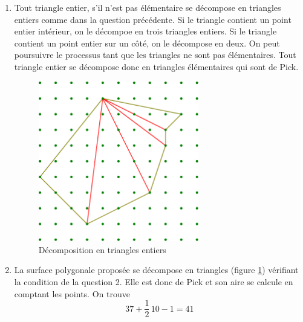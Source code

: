 \begin{enumerate}
 \item Tout triangle entier, s'il n'est pas élémentaire se décompose en triangles entiers comme dans la question précédente. 
Si le triangle contient un point entier intérieur, on le décompoe en trois triangles entiers. Si le triangle contient un point entier sur un côté, on le décompose en deux. On peut poursuivre le processus tant que les triangles ne sont pas élémentaires. Tout triangle entier se décompose donc en triangles élémentaires qui sont de Pick.
\begin{figure}[!ht]
 \centering
 \includegraphics[width=7cm]{./Cpick_1.pdf}
 \caption{Décomposition en triangles entiers}
 \label{fig:Cpick_1}
\end{figure}

 \item La surface polygonale proposée se décompose en triangles (figure \ref{fig:Cpick_1}) vérifiant la condition de la question 2. Elle est donc de Pick et son aire se calcule en comptant les points. On trouve
\begin{displaymath}
 37 + \frac{1}{2}\,10 -1 =41
\end{displaymath}

\end{enumerate}
